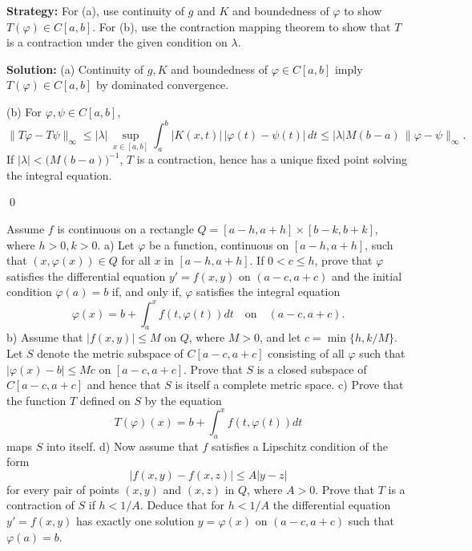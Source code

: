 \noindent\textbf{Strategy:} For (a), use continuity of $g$ and $K$ and boundedness of $\varphi$ to show $T(\varphi) \in C[a,b]$. For (b), use the contraction mapping theorem to show that $T$ is a contraction under the given condition on $\lambda$.

\bigskip\noindent\textbf{Solution:}
(a) Continuity of $g,K$ and boundedness of $\varphi\in C[a,b]$ imply $T(\varphi)\in C[a,b]$ by dominated convergence.

(b) For $\varphi,\psi\in C[a,b]$,
\[\|T\varphi-T\psi\|_\infty \le |\lambda|\,\sup_{x\in[a,b]}\int_a^b |K(x,t)|\,|\varphi(t)-\psi(t)|\,dt \le |\lambda|M(b-a)\,\|\varphi-\psi\|_\infty.
\]
If $|\lambda|<\big(M(b-a)\big)^{-1}$, $T$ is a contraction, hence has a unique fixed point solving the integral equation.




\qed
\begin{problembox}
\begin{problemstatement}
Assume $f$ is continuous on a rectangle $Q = [a - h, a + h] \times [b - k, b + k]$, where $h > 0, k > 0$.
a) Let $\varphi$ be a function, continuous on $[a - h, a + h]$, such that $(x, \varphi(x)) \in Q$ for all $x$ in $[a - h, a + h]$. If $0 < c \leq h$, prove that $\varphi$ satisfies the differential equation $y' = f(x, y)$ on $(a - c, a + c)$ and the initial condition $\varphi(a) = b$ if, and only if, $\varphi$ satisfies the integral equation 
\[\varphi(x) = b + \int_a^x f(t, \varphi(t)) dt \quad \text{on} \quad (a - c, a + c).\]
b) Assume that $|f(x, y)| \leq M$ on $Q$, where $M > 0$, and let $c = \min \{h, k/M\}$. Let $S$ denote the metric subspace of $C[a - c, a + c]$ consisting of all $\varphi$ such that $|\varphi(x) - b| \leq Mc$ on $[a - c, a + c]$. Prove that $S$ is a closed subspace of $C[a - c, a + c]$ and hence that $S$ is itself a complete metric space.
c) Prove that the function $T$ defined on $S$ by the equation 
\[T(\varphi)(x) = b + \int_a^x f(t, \varphi(t)) dt\]
maps $S$ into itself.
d) Now assume that $f$ satisfies a Lipschitz condition of the form 
\[|f(x, y) - f(x, z)| \leq A|y - z|\]
for every pair of points $(x, y)$ and $(x, z)$ in $Q$, where $A > 0$. Prove that $T$ is a contraction of $S$ if $h < 1/A$. Deduce that for $h < 1/A$ the differential equation $y' = f(x, y)$ has exactly one solution $y = \varphi(x)$ on $(a - c, a + c)$ such that $\varphi(a) = b$.
\end{problemstatement}
\end{problembox}

